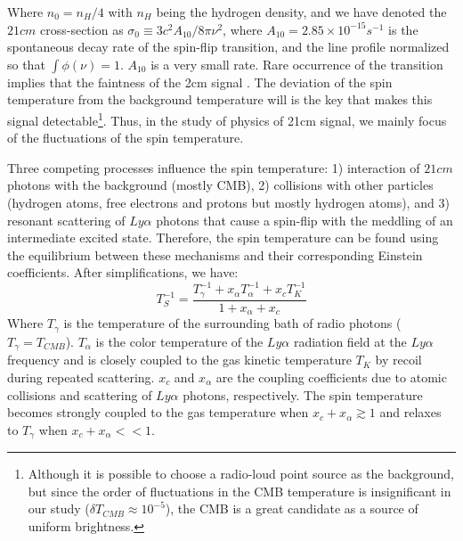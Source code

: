\documentclass[12pt, TexShade, letterpaper]{report}
\begin{document}
Where $n_0 = n_H /4$ with $n_H$ being the hydrogen density, and we have denoted the $21cm$ cross-section as $\sigma_0 \equiv 3c^2 A_{10}/8\pi \nu^2$, where $A_{10} = 2.85 \times 10^{-15} s^{-1}$ is the spontaneous decay rate of the spin-flip transition, and the line profile normalized so that $\int \phi \left(\nu\right) =1$. $A_{10}$ is a very small rate. Rare occurrence of the transition implies that the faintness of the 2cm signal \cite{kit_thesis}. The deviation of the spin temperature from the background temperature will is the key that makes this signal detectable\footnote{Although it is possible to choose a radio-loud point source as the background, but since the order of fluctuations in the CMB temperature is insignificant in our study ($\delta T_{CMB} \approx 10 ^{-5}$), the CMB is a great candidate as a source of uniform brightness\cite{21century}.}. Thus, in the study of physics of 21cm signal, we mainly focus of the fluctuations of the spin temperature.\par
Three competing processes influence the spin temperature: 1) interaction of $21cm$ photons with the background (mostly CMB), 2) collisions with other particles (hydrogen atoms, free electrons and protons\cite{low_frequency} but mostly hydrogen atoms), and 3) resonant scattering of $Ly\alpha$ photons that cause a spin-flip with the meddling of an intermediate excited state. Therefore, the spin temperature can be found using the equilibrium between these mechanisms and their corresponding Einstein coefficients. After simplifications, we have:
\begin{equation}
    T^{-1}_S = \frac{T^{-1}_\gamma + x_\alpha T^{-1}_\alpha + x_c T^{-1}_K}{1 + x_\alpha + x_c}
\end{equation}
Where $T_\gamma$ is the temperature of the surrounding bath of radio photons ($T_\gamma = T_{CMB}$). $T_\alpha$ is the color temperature of the $Ly\alpha$ radiation field at the $Ly\alpha$ frequency and is closely coupled to the gas kinetic temperature $T_K$ by recoil during repeated scattering. $x_c$ and $x_\alpha$ are the coupling coefficients due to atomic collisions and scattering of $Ly\alpha$ photons, respectively. The spin temperature becomes strongly coupled to the gas temperature when $x_c + x_\alpha \gtrsim 1$ and relaxes to $T_\gamma$ when $x_c + x_\alpha << 1$. 
\end{document}

